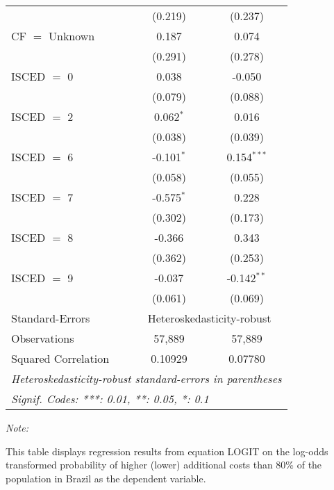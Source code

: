 \begin{table}[htbp!]
\begin{adjustbox}{width = 1\textwidth, max height = 0.95\textheight, center}
\begin{threeparttable}[b]
\begin{tabular}{lcc}
                                 & (0.219)        & (0.237)\\   
            CF $=$ Unknown       & 0.187          & 0.074\\   
                                 & (0.291)        & (0.278)\\   
            ISCED $=$ 0          & 0.038          & -0.050\\   
                                 & (0.079)        & (0.088)\\   
            ISCED $=$ 2          & 0.062$^{*}$    & 0.016\\   
                                 & (0.038)        & (0.039)\\   
            ISCED $=$ 6          & -0.101$^{*}$   & 0.154$^{***}$\\   
                                 & (0.058)        & (0.055)\\   
            ISCED $=$ 7          & -0.575$^{*}$   & 0.228\\   
                                 & (0.302)        & (0.173)\\   
            ISCED $=$ 8          & -0.366         & 0.343\\   
                                 & (0.362)        & (0.253)\\   
            ISCED $=$ 9          & -0.037         & -0.142$^{**}$\\   
                                 & (0.061)        & (0.069)\\   
            \midrule 
            Standard-Errors & \multicolumn{2}{c}{Heteroskedasticity-robust} \\ 
            Observations         & 57,889         & 57,889\\  
            Squared Correlation  & 0.10929        & 0.07780\\  
            \midrule \midrule
            \multicolumn{3}{l}{\emph{Heteroskedasticity-robust standard-errors in parentheses}}\\
            \multicolumn{3}{l}{\emph{Signif. Codes: ***: 0.01, **: 0.05, *: 0.1}}\\
         \end{tabular}
         
         \begin{tablenotes}\item \medskip \textit{Note:}
            \item This table displays regression results from equation LOGIT on the log-odds transformed probability of higher (lower) additional costs than 80\% of the population in Brazil as the dependent variable. 
         \end{tablenotes}
      \end{threeparttable}
   \end{adjustbox}
\end{table}


